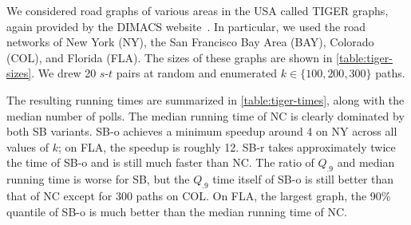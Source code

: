 \documentclass[runningheads,a4paper]{llncs}
\begin{document}
We considered road graphs of various areas in the USA called TIGER graphs, again provided by the DIMACS website~\cite{CUSTUM:dimacs9}.
In particular, we used the road networks of New York (NY), the San Francisco Bay Area (BAY), Colorado (COL), and Florida (FLA).
The sizes of these graphs are shown in \autoref{table:tiger-sizes}.
We drew 20 $s$-$t$ pairs at random and enumerated $k \in \{100, 200, 300\}$ paths.

The resulting running times are summarized in \autoref{table:tiger-times}, along with the median number of polls.
The median running time of NC is clearly dominated by both SB variants.
SB-o achieves a minimum speedup around 4 on NY across all values of $k$; on FLA, the speedup is roughly 12.
SB-r takes approximately twice the time of SB-o and is still much faster than NC.
The ratio of $Q_{.9}$ and median running time is worse for SB, but the $Q_{.9}$ time itself of SB-o is still better than that of NC except for 300 paths on COL.
On FLA, the largest graph, the 90\% quantile of SB-o is much better than the median running time of NC.




\appendix
\end{document}
